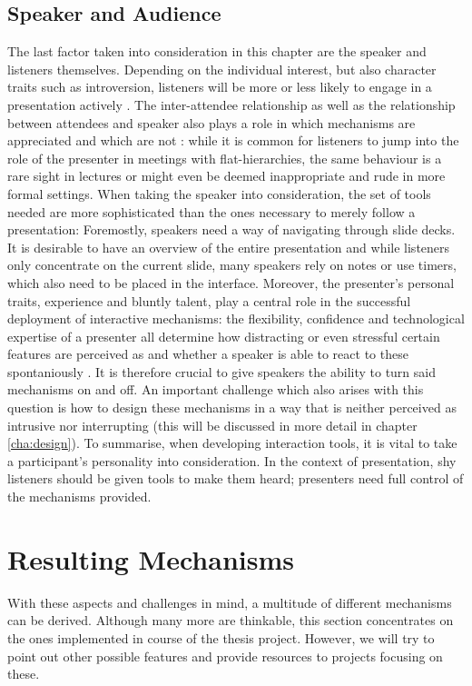 \subsection{Speaker and Audience}
The last factor taken into consideration in this chapter are the speaker and listeners themselves. Depending on the individual interest, but also character traits such as introversion, listeners will be more or less likely to engage in a presentation actively \cite{Bry:Backstage}. The inter-attendee relationship as well as the relationship between attendees and speaker also plays a role in which mechanisms are appreciated and which are not \cite{Moore:ThreeTypesOfInteraction}: while it is common for listeners to jump into the role of the presenter in meetings with flat-hierarchies, the same behaviour is a rare sight in lectures or might even be deemed inappropriate and rude in more formal settings. When taking the speaker into consideration, the set of tools needed are more sophisticated than the ones necessary to merely follow a presentation: Foremostly, speakers need a way of navigating through slide decks. It is desirable to have an overview of the entire presentation and while listeners only concentrate on the current slide, many speakers rely on notes or use timers, which also need to be placed in the interface.
Moreover, the presenter's personal traits, experience and bluntly talent, play a central role in the successful deployment of interactive mechanisms: the flexibility, confidence and technological expertise of a presenter all determine how distracting or even stressful certain features are perceived as and whether a speaker is able to react to these spontaniously \cite{Wacker:PresenterExperience}. It is therefore crucial to give speakers the ability to turn said mechanisms on and off. An important challenge which also arises with this question is how to design these mechanisms in a way that is neither perceived as intrusive nor interrupting (this will be discussed in more detail in chapter \ref{cha:design}).
To summarise, when developing interaction tools, it is vital to take a participant's personality into consideration. In the context of presentation, shy listeners should be given tools to make them heard; presenters need full control of the mechanisms provided.

\section{Resulting Mechanisms}
With these aspects and challenges in mind, a multitude of different mechanisms can be derived. Although many more are thinkable, this section concentrates on the ones implemented in course of the thesis project. However, we will try to point out other possible features and provide resources to projects focusing on these.

